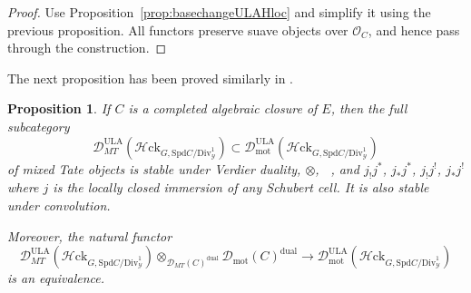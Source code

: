 \documentclass[11pt]{amsart}
\DeclareMathOperator{\sHom}{\!{\mathscr{H}\! om}}
\numberwithin{equation}{section}
\numberwithin{theorem}{section}
\newtheorem{proposition}[theorem]{Proposition}
\theoremstyle{definition}
\newcommand{\Hloc}{{\mathcal H}{\mathrm{ck}}}
\begin{document}
\begin{proof} Use Proposition~\ref{prop:basechangeULAHloc} and simplify it using the previous proposition. All functors preserve suave objects over $\mathcal O_C$, and hence pass through the construction.
\end{proof}

The next proposition has been proved similarly in \cite[Theorem 4.8]{RicharzScholbachWitt}.

\begin{proposition} If $C$ is a completed algebraic closure of $E$, then the full subcategory
\[
\mathcal D_{MT}^{\mathrm{ULA}}(\Hloc_{G,\mathrm{Spd} C/\mathrm{Div}^1_{\mathcal Y}})\subset \mathcal D_{\mathrm{mot}}^{\mathrm{ULA}}(\Hloc_{G,\mathrm{Spd} C/\mathrm{Div}^1_{\mathcal Y}})
\]
of mixed Tate objects is stable under Verdier duality, $\otimes$, $\sHom$, and $j_! j^\ast$, $j_\ast j^\ast$, $j_! j^!$, $j_\ast j^!$ where $j$ is the locally closed immersion of any Schubert cell. It is also stable under convolution.

Moreover, the natural functor
\[
\mathcal D_{MT}^{\mathrm{ULA}}(\Hloc_{G,\mathrm{Spd} C/\mathrm{Div}^1_{\mathcal Y}})\otimes_{\mathcal D_{MT}(C)^{\mathrm{dual}}} \mathcal D_{\mathrm{mot}}(C)^{\mathrm{dual}}\to \mathcal D_{\mathrm{mot}}^{\mathrm{ULA}}(\Hloc_{G,\mathrm{Spd} C/\mathrm{Div}^1_{\mathcal Y}})
\]
is an equivalence.
\end{proposition}
\end{document}
